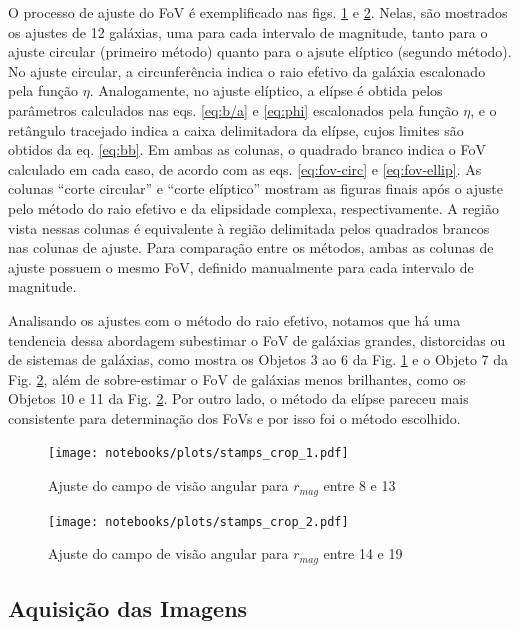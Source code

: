 O processo de ajuste do FoV é exemplificado nas figs. \ref{fig:fov-stamps-1} e \ref{fig:fov-stamps-2}. Nelas, são mostrados os ajustes de 12 galáxias, uma para cada intervalo de magnitude, tanto para o ajuste circular (primeiro método) quanto para o ajsute elíptico (segundo método). No ajuste circular, a circunferência indica o raio efetivo da galáxia escalonado pela função $\eta$. Analogamente, no ajuste elíptico, a elípse é obtida pelos parâmetros calculados nas eqs. \eqref{eq:b/a} e \eqref{eq:phi} escalonados pela função $\eta$, e o retângulo tracejado indica a caixa delimitadora da elípse, cujos limites são obtidos da eq. \eqref{eq:bb}. Em ambas as colunas, o quadrado branco indica o FoV calculado em cada caso, de acordo com as eqs. \eqref{eq:fov-circ} e \eqref{eq:fov-ellip}. As colunas ``corte circular'' e ``corte elíptico'' mostram as figuras finais após o ajuste pelo método do raio efetivo e da elipsidade complexa, respectivamente. A região vista nessas colunas é equivalente à região delimitada pelos quadrados brancos nas colunas de ajuste. Para comparação entre os métodos, ambas as colunas de ajuste possuem o mesmo FoV, definido manualmente para cada intervalo de magnitude.

Analisando os ajustes com o método do raio efetivo, notamos que há uma tendencia dessa abordagem subestimar o FoV de galáxias grandes, distorcidas ou de sistemas de galáxias, como mostra os Objetos 3 ao 6 da Fig. \ref{fig:fov-stamps-1} e o Objeto 7 da Fig. \ref{fig:fov-stamps-2}, além de sobre-estimar o FoV de galáxias menos brilhantes, como os Objetos 10 e 11 da Fig. \ref{fig:fov-stamps-2}. Por outro lado, o método da elípse pareceu mais consistente para determinação dos FoVs e por isso foi o método escolhido.

\newpage
\begin{figure}[!ht]
  \centering
  \texttt{[image: notebooks/plots/stamps\_crop\_1.pdf]}
  \caption{Ajuste do campo de visão angular para $r_{mag}$ entre 8 e 13}
  \label{fig:fov-stamps-1}
\end{figure}

\begin{figure}[!ht]
  \centering
  \texttt{[image: notebooks/plots/stamps\_crop\_2.pdf]}
  \caption{Ajuste do campo de visão angular para $r_{mag}$ entre 14 e 19}
  \label{fig:fov-stamps-2}
\end{figure}








\subsection{Aquisição das Imagens}
\label{sec:aquisicao-stamps}

